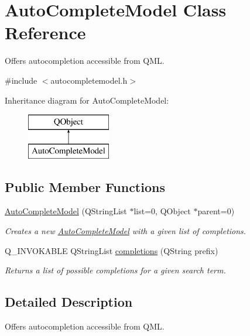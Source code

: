 \hypertarget{classAutoCompleteModel}{\section{Auto\-Complete\-Model Class Reference}
\label{classAutoCompleteModel}
}


Offers autocompletion accessible from Q\-M\-L.  




{\ttfamily \#include $<$autocompletemodel.\-h$>$}

Inheritance diagram for Auto\-Complete\-Model\-:\begin{figure}[H]
\begin{center}
\leavevmode
\includegraphics[height=2.000000cm]{classAutoCompleteModel}
\end{center}
\end{figure}
\subsection*{Public Member Functions}
\begin{DoxyCompactItemize}
\item 
\hyperlink{classAutoCompleteModel_ae7c8421f60a6602bf43e11199c69a130}{Auto\-Complete\-Model} (Q\-String\-List $\ast$list=0, Q\-Object $\ast$parent=0)
\begin{DoxyCompactList}\small\item\em Creates a new {\ttfamily \hyperlink{classAutoCompleteModel}{Auto\-Complete\-Model}} with a given list of completions. \end{DoxyCompactList}\item 
Q\-\_\-\-I\-N\-V\-O\-K\-A\-B\-L\-E Q\-String\-List \hyperlink{classAutoCompleteModel_a4f7f2ee3af6dd85e26158a280d933a86}{completions} (Q\-String prefix)
\begin{DoxyCompactList}\small\item\em Returns a list of possible completions for a given search term. \end{DoxyCompactList}\end{DoxyCompactItemize}


\subsection{Detailed Description}
Offers autocompletion accessible from Q\-M\-L. 

